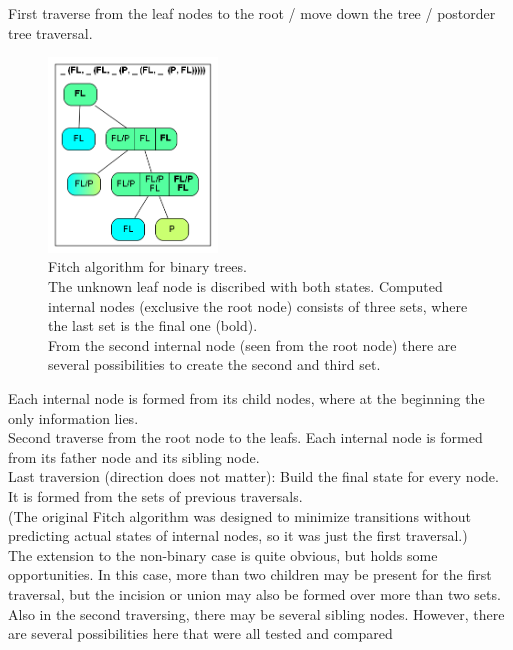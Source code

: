         First traverse from the leaf nodes to the root / move down the tree / postorder tree traversal.
          \begin{figure}
            \centering
            \includegraphics[width=0.4\textwidth]{Figures/Fitch1.png}
            \caption{Fitch algorithm for binary trees. \\
              The unknown leaf node is discribed with both states. Computed internal nodes (exclusive the 
              root node) consists of three sets, where the last set is the final one (bold). \\
              From the second internal node (seen from the root node) there are several possibilities to 
              create the second and third set.}
            \label{fig: binary Fitch}
          \end{figure} 
          Each internal node is formed from its child nodes, where at the beginning the only information
          lies. \\
        Second traverse from the root node to the leafs. Each internal node is formed from its father node 
          and its sibling node. \\
        Last traversion (direction does not matter): Build the final state for every node. It is formed 
          from the sets of previous traversals. \\
        (The original Fitch algorithm was designed to minimize transitions without predicting actual states 
          of internal nodes, so it was just the first traversal.) \\
        The extension to the non-binary case is quite obvious, but holds some opportunities. In this case, 
          more than two children may be present for the first traversal, but the incision or union may 
          also be formed over more than two sets. Also in the second traversing, there may be several 
          sibling nodes. However, there are several possibilities here that were all tested and compared 
